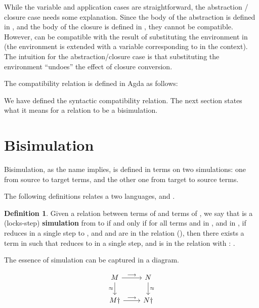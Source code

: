 \documentclass[bsc,frontabs,oneside,singlespacing,parskip,deptreport]{infthesis}
\theoremstyle{definition}
\newtheorem*{definition}{Definition}
\theoremstyle{lemma}
\begin{document}
While the variable and application cases are straightforward, the
abstraction / closure case needs some explanation. Since the body
 of the abstraction is defined in , and the body of
the closure  is defined in , they cannot be
compatible. However,  can be compatible with the result of
substituting the environment  in  (the environment is
extended with a variable corresponding to  in the
context). The intuition for the abstraction/closure case is that
substituting the environment ``undoes'' the effect of closure
conversion.  

The compatibility relation is defined in Agda as follows:


We have defined the syntactic compatibility relation. The next
section states what it means for a relation to be a bisimulation.

\section{Bisimulation}

Bisimulation, as the name implies, is defined in terms on two
simulations: one from source to target terms, and the other one from
target to source terms.

The following definitions relates a two languages,  and
.

\begin{definition}
  Given a relation  between terms of  and terms of ,
  we say that  is a (locks-step) \textbf{simulation} from 
  to  if and only if for all terms  and  in ,
  and  in , if  reduces in a single step to ,
  and  and  are in the  relation (),
  then there exists a term  in  such that  reduces
  to  in a single step, and  is in the  relation
  with : .
\end{definition}

The essence of simulation can be captured in a diagram.

\[ \begin{tikzcd}
M \arrow{r}{\longrightarrow} \arrow[swap]{d}{\approx} & N \arrow{d}{\approx} \\%
M \dagger \arrow{r}{\longrightarrow}& N \dagger
\end{tikzcd}
\]
\end{document}
